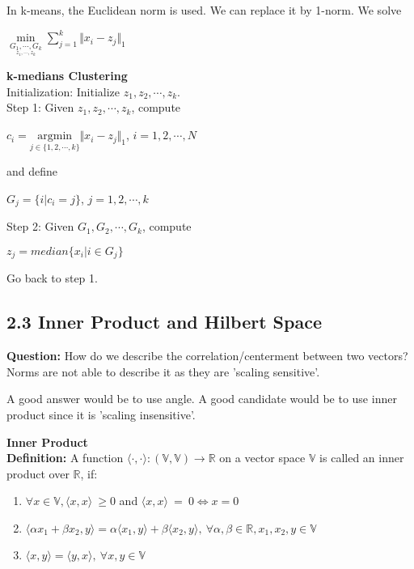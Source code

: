 \documentclass{article}
\begin{document}
In k-means, the Euclidean norm is used. We can replace it by 1-norm. We solve 
\begin{center}
    $\underset{\underset{z_1, \cdots, z_k}{G_1, \cdots, G_k}}{\min} \sum_{j=1}^{k} \Vert x_i - z_j \Vert_1$
\end{center}
\textbf{k-medians Clustering} \\
Initialization: Initialize $z_1, z_2, \cdots, z_k$. \\
Step 1: Given $z_1,z_2, \cdots, z_k$, compute
\begin{center}
    $c_i = \underset{j \in \{1,2,\cdots,k\}}{\text{argmin}}\Vert x_i - z_j \Vert_{1}$, $i = 1,2, \cdots, N$ 
\end{center}
and define 
\begin{center}
    $G_j = \{i|c_i = j\}$, $j = 1,2, \cdots, k$
\end{center}
Step 2: Given $G_1,G_2,\cdots,G_k$, compute
\begin{center}
    $z_j = median\{x_i | i \in G_j\}$
\end{center}
Go back to step 1.


\pagebreak



\subsection*{2.3 Inner Product and Hilbert Space}
\textbf{Question:} How do we describe the correlation/centerment between two vectors? Norms are not able to describe it as they are 'scaling sensitive'. \\

\bigbreak

A good answer would be to use angle. A good candidate would be to use inner product since it is 'scaling insensitive'. 

\bigbreak

\textbf{Inner Product} \\
\textbf{Definition:} A function $\langle \cdot,\cdot\rangle : (\mathbb{V},\mathbb{V}) \to \mathbb{R}$ on a vector space $\mathbb{V}$ is called an inner product over $\mathbb{R}$, if: 
    \begin{enumerate}
        \item $\forall x \in \mathbb{V}, \langle x,x\rangle  \ \geq 0$ and  $\langle x,x\rangle  \ = \ 0 \iff x = 0$
        \item $\langle \alpha x_1 + \beta x_2, y\rangle  = \alpha \langle x_1,y\rangle  + \beta \langle x_2,y\rangle,  \  \forall \alpha, \beta \in \mathbb{R}, x_1, x_2, y \in \mathbb{V}$
        \item $\langle x,y\rangle  = \langle y,x\rangle, \ \forall x, y \in \mathbb{V}$
    \end{enumerate}
\end{document}
